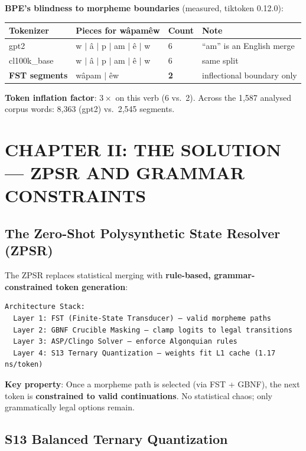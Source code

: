 \documentclass[11pt,oneside]{article}
\begin{document}
\textbf{BPE's blindness to morpheme boundaries} (measured, tiktoken 0.12.0):

\begin{center}
\begin{tabular}{llll}
\toprule
Tokenizer & Pieces for wâpamêw & Count & Note \\
\midrule
gpt2 & w $\mid$ â $\mid$ p $\mid$ am $\mid$ ê $\mid$ w & 6 & ``am'' is an English merge \\
cl100k\_base & w $\mid$ â $\mid$ p $\mid$ am $\mid$ ê $\mid$ w & 6 & same split \\
\textbf{FST segments} & wâpam $\mid$ êw & \textbf{2} & inflectional boundary only \\
\bottomrule
\end{tabular}
\end{center}

\textbf{Token inflation factor}: $3\times$ on this verb (6 vs.\ 2). Across the 1,587 analysed corpus words: 8,363 (gpt2) vs.\ 2,545 segments.

\section{CHAPTER II: THE SOLUTION --- ZPSR AND GRAMMAR CONSTRAINTS}

\subsection{The Zero-Shot Polysynthetic State Resolver (ZPSR)}

The ZPSR replaces statistical merging with \textbf{rule-based, grammar-constrained token generation}:

\begin{lstlisting}
Architecture Stack:
  Layer 1: FST (Finite-State Transducer) — valid morpheme paths
  Layer 2: GBNF Crucible Masking — clamp logits to legal transitions
  Layer 3: ASP/Clingo Solver — enforce Algonquian rules
  Layer 4: S13 Ternary Quantization — weights fit L1 cache (1.17 ns/token)
\end{lstlisting}

\textbf{Key property}: Once a morpheme path is selected (via FST + GBNF), the next token is \textbf{constrained to valid continuations}. No statistical chaos; only grammatically legal options remain.

\subsection{S13 Balanced Ternary Quantization}
\end{document}
